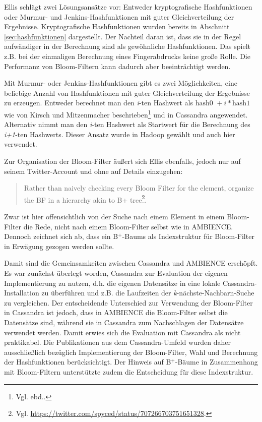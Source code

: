 Ellis schlägt zwei Lösungsansätze vor: Entweder kryptografische Hashfunktionen oder Murmur- und Jenkins-Hashfunktionen mit guter Gleichverteilung der Ergebnisse. Kryptografische Hashfunktionen wurden bereits in Abschnitt \ref{sec:hashfunktionen} dargestellt. Der Nachteil daran ist, dass sie in der Regel aufwändiger in der Berechnung sind als gewöhnliche Hashfunktionen. Das spielt z.B. bei der einmaligen Berechnung eines Fingerabdrucks keine große Rolle. Die Performanz von Bloom-Filtern kann dadurch aber beeinträchtigt werden. 

Mit Murmur- oder Jenkins-Hashfunktionen gibt es zwei Möglichkeiten, eine beliebige Anzahl von Hashfunktionen mit guter Gleichverteilung der Ergebnisse zu erzeugen. Entweder berechnet man den \textit{i}-ten Hashwert als $\text{hash0 }+ i\ast \text{hash1}$ wie von Kirsch und Mitzenmacher beschrieben\footnote{Vgl. ebd..} und in Cassandra angewendet. Alternativ nimmt man den \textit{i}-ten Hashwert als Startwert für die Berechnung des \textit{i+1}-ten Hashwerts. Dieser Ansatz wurde in Hadoop gewählt und auch hier verwendet. 

Zur Organisation der Bloom-Filter äußert sich Ellis ebenfalls, jedoch nur auf seinem Twitter-Account und ohne auf Details einzugehen: 
\begin{quote}
Rather than naively checking every Bloom Filter for the element, organize the BF in a hierarchy akin to B+ tree\footnote{Vgl. \url{https://twitter.com/spyced/status/707266703751651328}.}.
\end{quote}
Zwar ist hier offensichtlich von der Suche nach einem Element in einem Bloom-Filter die Rede, nicht nach einem Bloom-Filter selbst wie in AMBIENCE. Dennoch zeichnet sich ab, dass ein B$^+$-Baums als Indexstruktur für Bloom-Filter in Erwägung gezogen werden sollte. 

Damit sind die Gemeinsamkeiten zwischen Cassandra und AMBIENCE erschöpft. Es war zunächst überlegt worden, Cassandra zur Evaluation der eigenen Implementierung zu nutzen, d.h. die eigenen Datensätze in eine lokale Cassandra-Installation zu überführen und z.B. die Laufzeiten der \textit{k}-nächste-Nachbarn-Suche zu vergleichen. Der entscheidende Unterschied zur Verwendung der Bloom-Filter in Cassandra ist jedoch, dass in AMBIENCE die Bloom-Filter selbst die Datensätze sind, während sie in Cassandra zum Nachschlagen der Datensätze verwendet werden. Damit erwies sich die Evaluation mit Cassandra als nicht praktikabel. Die Publikationen aus dem Cassandra-Umfeld wurden daher ausschließlich bezüglich Implementierung der Bloom-Filter, Wahl und Berechnung der Hashfunktionen berücksichtigt. Der Hinweis auf B$^+$-Bäume in Zusammenhang mit Bloom-Filtern unterstützte zudem die Entscheidung für diese Indexstruktur. 
